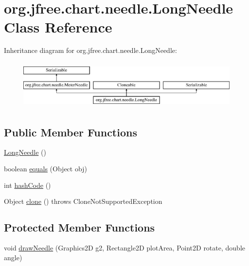 \hypertarget{classorg_1_1jfree_1_1chart_1_1needle_1_1_long_needle}{}\section{org.\+jfree.\+chart.\+needle.\+Long\+Needle Class Reference}
\label{classorg_1_1jfree_1_1chart_1_1needle_1_1_long_needle}
Inheritance diagram for org.\+jfree.\+chart.\+needle.\+Long\+Needle\+:\begin{figure}[H]
\begin{center}
\leavevmode
\includegraphics[height=2.533937cm]{classorg_1_1jfree_1_1chart_1_1needle_1_1_long_needle}
\end{center}
\end{figure}
\subsection*{Public Member Functions}
\begin{DoxyCompactItemize}
\item 
\mbox{\hyperlink{classorg_1_1jfree_1_1chart_1_1needle_1_1_long_needle_a3ccbd219b0c3377a400d549faf871b1b}{Long\+Needle}} ()
\item 
boolean \mbox{\hyperlink{classorg_1_1jfree_1_1chart_1_1needle_1_1_long_needle_a3e0291a7ae6393b1fba6ccbfa5d5769a}{equals}} (Object obj)
\item 
int \mbox{\hyperlink{classorg_1_1jfree_1_1chart_1_1needle_1_1_long_needle_aa12f79a67f17b0413ae5a1d9179386d8}{hash\+Code}} ()
\item 
Object \mbox{\hyperlink{classorg_1_1jfree_1_1chart_1_1needle_1_1_long_needle_ac104afc1fb926b555ccde1ea72856303}{clone}} ()  throws Clone\+Not\+Supported\+Exception 
\end{DoxyCompactItemize}
\subsection*{Protected Member Functions}
\begin{DoxyCompactItemize}
\item 
void \mbox{\hyperlink{classorg_1_1jfree_1_1chart_1_1needle_1_1_long_needle_ac1943d53241da5628da862893993c7f4}{draw\+Needle}} (Graphics2D g2, Rectangle2D plot\+Area, Point2D rotate, double angle)
\end{DoxyCompactItemize}
